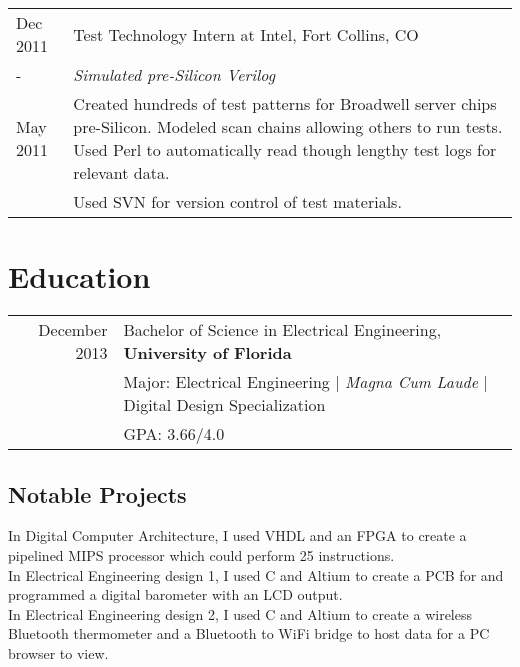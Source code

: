 \documentclass[a4paper,10pt]{article} %
\begin{document}
\begin{tabular}{p{1.6cm}|p{12.4cm}}

\centering Dec 2011 & Test Technology Intern at Intel, Fort Collins, CO \emph{}\\
\centering - & \emph{Simulated pre-Silicon Verilog}\\
\centering May 2011&\footnotesize{Created hundreds of test patterns for Broadwell server chips pre-Silicon. Modeled scan chains allowing others to run tests. Used Perl to automatically read though lengthy test logs for relevant data.}\\
&\footnotesize{Used SVN for version control of test materials.}\\
\end{tabular}

\pagebreak

\section{Education}

\begin{tabular}{rl}
December 2013 & Bachelor of Science in Electrical Engineering, \textbf{University of Florida}\\
& \small{Major: Electrical Engineering  | \emph{Magna Cum Laude}  |  Digital Design Specialization}\\
&\normalsize GPA: 3.66/4.0\\
\end{tabular}
\subsection{Notable Projects}

\small
In Digital Computer Architecture, I used VHDL and an FPGA to create a pipelined MIPS processor which could perform 25 instructions.\\

In Electrical Engineering design 1, I used C and Altium to create a PCB for and programmed a digital barometer with an LCD output.\\

In Electrical Engineering design 2, I used C and Altium to create a wireless Bluetooth thermometer and a Bluetooth to WiFi bridge to host data for a PC browser to view.\\
\end{document}
